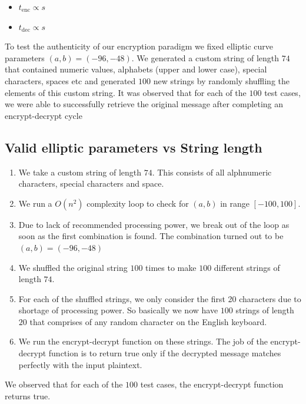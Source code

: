 \documentclass[cryptography,article,submit,moreauthors,pdftex]{Definitions/mdpi}
\begin{document}
\begin{itemize}
	\centering
	\item $t_{\text{enc}}\propto s$
	\item $t_{\text{dec}}\propto s$
\end{itemize}

\begin{flushleft}
To test the authenticity of our encryption paradigm we fixed elliptic curve parameters $(a,b)=(-96,-48)$. We generated a custom string of length $74$ that contained numeric values, alphabets (upper and lower case), special characters, spaces etc and generated $100$ new strings by randomly shuffling the elements of this custom string. It was observed that for each of the $100$ test cases, we were able to successfully retrieve the original message after completing an encrypt-decrypt cycle
\end{flushleft}

\subsection{Valid elliptic parameters vs String length}
\begin{enumerate}
	\item We take a custom string of length $74$. This consists of all alphnumeric characters, special characters and space.
	\item We run a $O(n^2)$ complexity loop to check for $(a,b)$ in range $[-100,100]$.
	\item Due to lack of recommended processing power, we break out of the loop as soon as the first combination is found. The combination turned out to be $(a,b)=(-96,-48)$
	\item We shuffled the original string $100$ times to make $100$ different strings of length $74$.
	\item For each of the shuffled strings, we only consider the first 20 characters due to shortage of processing power. So basically we now have $100$ strings of length $20$ that comprises of any random character on the English keyboard.
	\item We run the encrypt-decrypt function on these strings. The job of the encrypt-decrypt function is to return true only if the decrypted message matches perfectly with the input plaintext.
\end{enumerate}

\begin{flushleft}
We observed that for each of the $100$ test cases, the encrypt-decrypt function returns true.
\end{flushleft}
\end{document}
